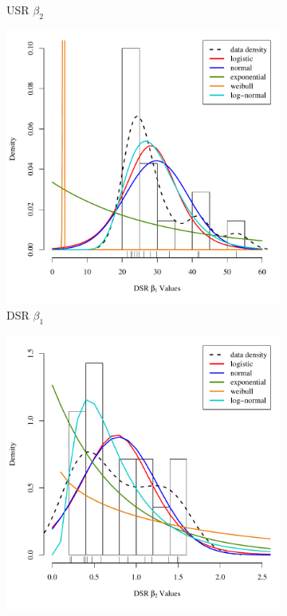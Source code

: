 \begin{linenumbers}
\begin{figure}[htbp]
\begin{subfigure}{0.5\textwidth}
	\caption{USR $\beta_2$}
	\label{sub b2}
\end{subfigure}
\begin{subfigure}{0.5\textwidth}
	\centering
	\includegraphics[width=0.9\linewidth]{"Figures/Results_DSR/Stochastic/DSR B1 Dist"}
	\caption{DSR $\beta_1$}
	\label{sub b1}
\end{subfigure}%
\begin{subfigure}{0.5\textwidth}
	\centering
	\includegraphics[width=0.9\linewidth]{"Figures/Results_DSR/Stochastic/DSR B2 Dist"}

\end{subfigure}
\end{figure}
\end{linenumbers}

